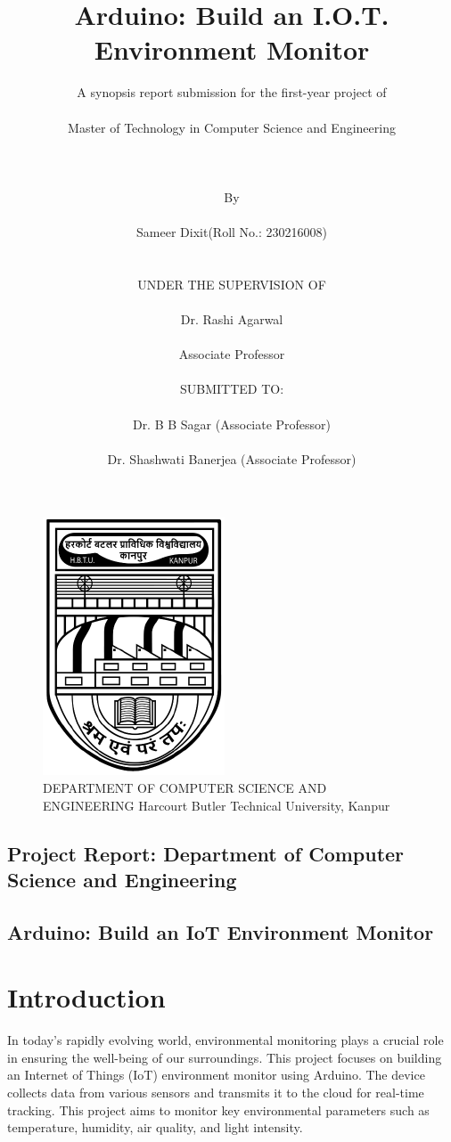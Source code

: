 \documentclass[12pt]{report}
\title{Arduino: Build an I.O.T. Environment Monitor}
\author{A synopsis report submission for the first-year project of\\\\
	Master of Technology in Computer Science and Engineering\\\\\\
	\\By\\
	\\Sameer Dixit(Roll No.: 230216008)\\\\
	\\UNDER THE SUPERVISION OF \\
	\\Dr. Rashi Agarwal\\
	\\Associate Professor\\ 
	\\SUBMITTED TO:\\ 
	\\Dr. B B Sagar (Associate Professor)\\
	\\Dr. Shashwati Banerjea (Associate Professor) }
\begin{document}
	\maketitle
	\begin{figure}[h]
		\centering
		\includegraphics[scale=0.6]{hbtulogo.png}
		\caption[logo]{DEPARTMENT OF COMPUTER SCIENCE AND ENGINEERING Harcourt Butler Technical University, Kanpur}
		\label{hbtu_logo}
	\end{figure}
	\clearpage
	
	\subsection*{Project Report: Department of Computer Science and Engineering}
	\vspace{0.5cm}
	
	\subsection*{Arduino: Build an IoT Environment Monitor}
	\vspace{0.5cm}
	
	\section*{Introduction}
	\raggedright
	In today's rapidly evolving world, environmental monitoring plays a crucial role in ensuring
	the well-being of our surroundings. This project focuses on building an Internet of Things
	(IoT) environment monitor using Arduino. The device collects data from various sensors
	and transmits it to the cloud for real-time tracking. This project aims to monitor key
	environmental parameters such as temperature, humidity, air quality, and light intensity.\\
	
\end{document}
